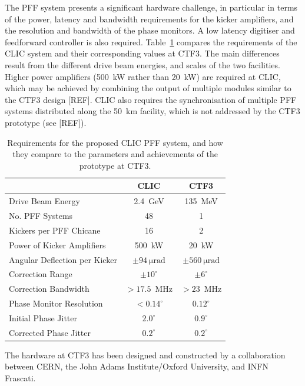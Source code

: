 \documentclass[%
 reprint,
superscriptaddress,
 amsmath,amssymb,
 prl,
]{revtex4-1}
\begin{document}
The PFF system presents a significant hardware challenge, in particular in 
terms of the power, latency and bandwidth requirements for the kicker 
amplifiers, and the resolution and bandwidth of the phase monitors. A low 
latency digitiser and feedforward controller is also required.
Table~\ref{tab:pffspecs} compares the requirements of the CLIC system and their 
corresponding values at CTF3. 
The main differences result from the different drive beam energies, and scales 
of the two facilities. Higher power amplifiers (500~kW rather than 20~kW) are 
required at CLIC, which may be achieved by combining the output of multiple 
modules similar to the CTF3 design [REF]. CLIC also requires the 
synchronisation of multiple PFF systems distributed along the 50~km facility, 
which is not addressed by the CTF3 prototype (see [REF]).

\begin{table}
	\caption{\label{tab:pffspecs}
	    Requirements for the proposed CLIC PFF system, and how they compare to 
	    the parameters and achievements of the prototype at CTF3.}
\begin{ruledtabular}
	\begin{tabular}{lcc}
		 & CLIC & CTF3 \\
		\hline
		Drive Beam Energy & 2.4~GeV & 135~MeV \\
		No. PFF Systems & 48 & 1 \\
		Kickers per PFF Chicane & 16 & 2 \\
		Power of Kicker Amplifiers & 500~kW & 20~kW \\
		Angular Deflection per Kicker & \(\pm94~\mathrm{\mu rad}\) & 
		\(\pm560~\mathrm{\mu rad}\) \\
		Correction Range & \(\pm 10^\circ\) & \(\pm 6^\circ\) \\
		Correction Bandwidth & \(>17.5\)~MHz & \(>23\)~MHz \\
		Phase Monitor Resolution & \(< 0.14^\circ\) & \(0.12^\circ\)  \\
		Initial Phase Jitter & \(2.0^\circ\) & \(0.9^\circ\) \\
		Corrected Phase Jitter & \(0.2^\circ\) & \(0.2^\circ\) \\
	\end{tabular}
\end{ruledtabular}
\end{table}

The hardware at CTF3 has been designed and constructed by a collaboration 
between CERN, the John Adams Institute/Oxford University, and INFN Frascati.
\end{document}
